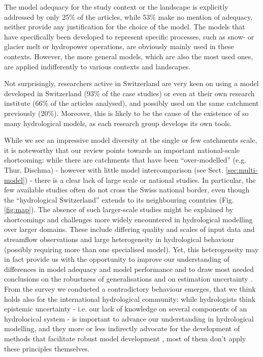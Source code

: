 \documentclass[10pt,a4paper]{article}
\begin{document}
The model adequacy for the study context or the landscape is explicitly addressed by only 25\% of the articles, while 53\% make no mention of adequacy, neither provide any justification for the choice of the model. The models that have specifically been developed to represent specific processes, such as snow- or glacier melt or hydropower operations, are obviously mainly used in these contexts. However, the more general models, which are also the most used ones, are applied indifferently to various contexts and landscapes.

Not surprisingly, researchers active in Switzerland are very keen on using a model developed in Switzerland (93\% of the case studies) or even at their own research institute (66\% of the articles analysed), and possibly used on the same catchment previously (20\%). Moreover, this is likely to be the cause of the existence of so many hydrological models, as each research group develops its own tools.


While we see an impressive model diversity at the single or few catchments scale, it is noteworthy that our review points towards an important national-scale shortcoming: while there are catchments that have been ``over-modelled'' (e.g. Thur, Dischma) - however with little model intercomparison (see Sect. \ref{sec:multi-model}) - there is a clear lack of large scale or national studies. In particular, the few available studies often do not cross the Swiss national border, even though the ``hydrological Switzerland'' extends to its neighbouring countries (Fig. \ref{fig:map}). The absence of such larger-scale studies might be explained by shortcomings and challenges more widely encountered in hydrological modelling over larger domains. These include differing quality and scales of input data and streamflow observations and large heterogeneity in hydrological behaviour (possibly requiring more than one specialised model). Yet, this heterogeneity may in fact provide us with the opportunity to improve our understanding of differences in model adequacy and model performance and to draw most needed conclusions on the robustness of generalisations and on estimation uncertainty \citep{Gupta2014,McMillan2016}.
From the survey we conducted a contradictory behaviour emerges, that we think holds also for the international hydrological community: while hydrologists think epistemic uncertainty - i.e. our lack of knowledge on several components of an hydrolocical system - is important to advance our understanding in hydrological modelling,  and they more or less indirectly advocate for the development of methods that facilitate robust model development \citep{Zheng2018}, most of them don't apply these principles themselves.
\end{document}
